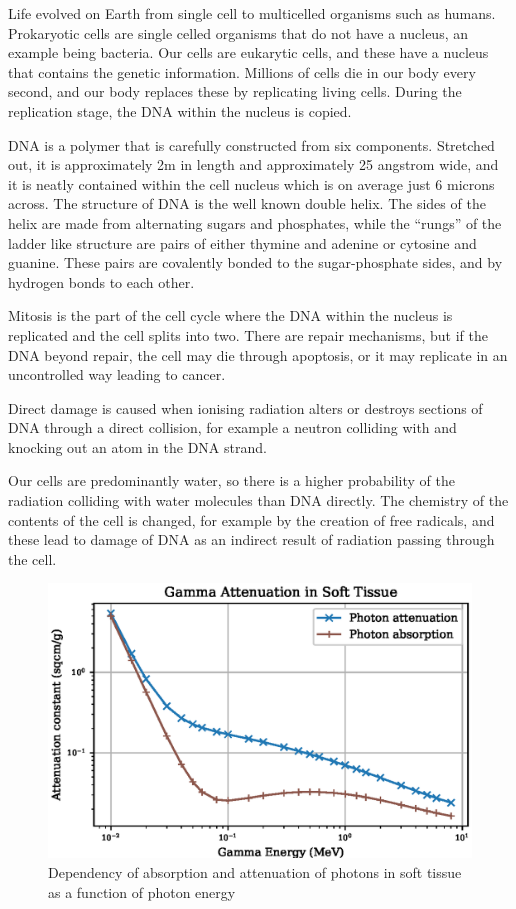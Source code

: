 Life evolved on Earth from single cell to multicelled organisms such as humans.  Prokaryotic cells are single celled organisms that do not have a nucleus, an example being bacteria.  Our cells are eukarytic cells, and these have a nucleus that contains the genetic information.  Millions of cells die in our body every second, and our body replaces these by replicating living cells.  During the replication stage, the DNA within the nucleus is copied.    

DNA is a polymer that is carefully constructed from six components.  Stretched out, it is approximately 2m in length and approximately 25 angstrom wide, and it is neatly contained within the cell nucleus which is on average just 6 microns across.  The structure of DNA is the well known double helix.  The sides of the helix are made from alternating sugars and phosphates, while the \enquote{rungs} of the ladder like structure are pairs of either thymine and adenine or cytosine and guanine.  These pairs are covalently bonded to the sugar-phosphate sides, and by hydrogen bonds to each other.

Mitosis is the part of the cell cycle where the DNA within the nucleus is replicated and the cell splits into two.  There are repair mechanisms, but if the DNA beyond repair, the cell may die through apoptosis, or it may replicate in an uncontrolled way leading to cancer.

Direct damage is caused when ionising radiation alters or destroys sections of DNA through a direct collision, for example a neutron colliding with and knocking out an atom in the DNA strand.

Our cells are predominantly water, so there is a higher probability of the radiation colliding with water molecules than DNA directly.  The chemistry of the contents of the cell is changed, for example by the creation of free radicals, and these lead to damage of DNA as an indirect result of radiation passing through the cell.

\begin{figure}[htb]
\centering
\includegraphics[width=0.5\linewidth]{chapters/consequences_of_ionizing_radiation/tissue/soft_tissue_gamma_attenuation.eps}
\caption{Dependency of absorption and attenuation of photons in soft tissue as a function of photon energy}
\label{fig:softtissueattenuation}
\end{figure}

